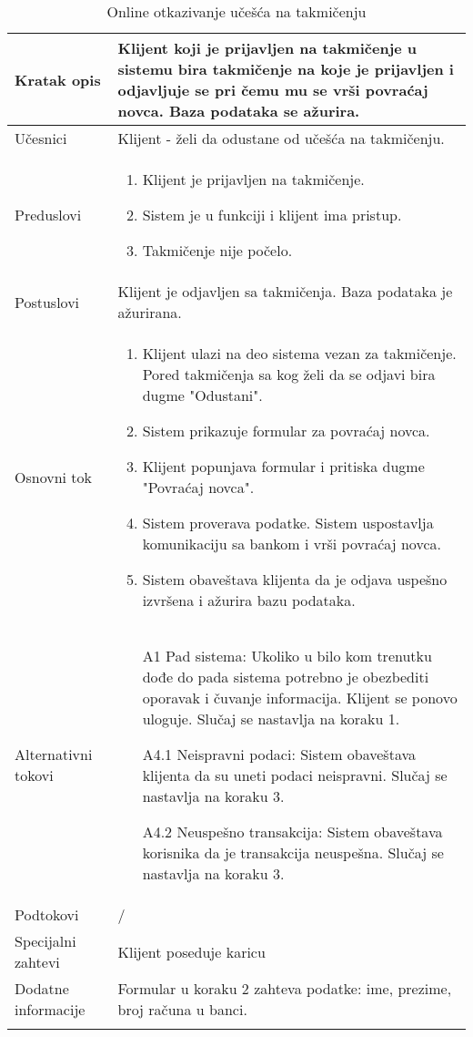 \documentclass[../../main.tex]{subfiles}
\begin{document}
\begin{longtable}{| p{} | p{} |} 
\hline
    Kratak opis &  Klijent koji je prijavljen na takmičenje u sistemu bira takmičenje na koje je prijavljen i odjavljuje se pri čemu mu se vrši povraćaj novca. Baza podataka se ažurira.\\ 
\hline    
    Učesnici & Klijent - želi da odustane od učešća na takmičenju.\\
\hline
   Preduslovi & \begin{enumerate}
       \item Klijent je prijavljen na takmičenje.
       \item Sistem je u funkciji i klijent ima pristup.
       \item Takmičenje nije počelo.
   \end{enumerate}\\
\hline  
    Postuslovi & Klijent je odjavljen sa takmičenja. Baza podataka je ažurirana.\\
\hline
    Osnovni tok & \begin{enumerate}
        \item Klijent ulazi na deo sistema vezan za takmičenje. Pored takmičenja sa kog želi da se odjavi bira dugme "Odustani".
        \item Sistem prikazuje formular za povraćaj novca.
        \item Klijent popunjava formular i pritiska dugme "Povraćaj novca".
        \item Sistem proverava podatke. Sistem uspostavlja komunikaciju sa bankom i vrši povraćaj novca. 
        \item Sistem obaveštava klijenta da je odjava uspešno izvršena i ažurira bazu podataka.
    \end{enumerate}\\
\hline
    Alternativni tokovi & \begin{itemize}
        \item[A1] Pad sistema: Ukoliko u bilo kom trenutku dođe do pada sistema potrebno je obezbediti oporavak i čuvanje informacija. Klijent se ponovo uloguje. Slučaj se nastavlja na koraku 1.
        \item[A4.1] Neispravni podaci: Sistem obaveštava klijenta da su uneti podaci neispravni. Slučaj se nastavlja na koraku 3.
        \item[A4.2] Neuspešno transakcija: Sistem obaveštava korisnika da je transakcija neuspešna. Slučaj se nastavlja na koraku 3.
    \end{itemize}\\
\hline
    Podtokovi & /\\
\hline
    Specijalni zahtevi & Klijent poseduje karicu\\
\hline
    Dodatne informacije & Formular u koraku 2 zahteva podatke: ime, prezime, broj računa u banci.\\
\hline
\caption{Online otkazivanje učešća na takmičenju} %
\end{longtable}
\end{document}
